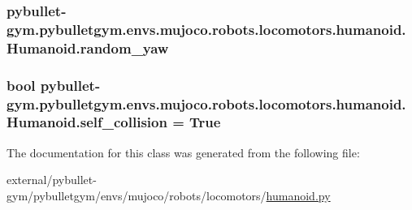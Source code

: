 \subsubsection[{\texorpdfstring{random\+\_\+yaw}{random_yaw}}]{\setlength{\rightskip}{0pt plus 5cm}pybullet-\/gym.\+pybulletgym.\+envs.\+mujoco.\+robots.\+locomotors.\+humanoid.\+Humanoid.\+random\+\_\+yaw}\hypertarget{classpybullet-gym_1_1pybulletgym_1_1envs_1_1mujoco_1_1robots_1_1locomotors_1_1humanoid_1_1_humanoid_a7bce1af1393e965d200d6770a3da069a}{}\label{classpybullet-gym_1_1pybulletgym_1_1envs_1_1mujoco_1_1robots_1_1locomotors_1_1humanoid_1_1_humanoid_a7bce1af1393e965d200d6770a3da069a}
\subsubsection[{\texorpdfstring{self\+\_\+collision}{self_collision}}]{\setlength{\rightskip}{0pt plus 5cm}bool pybullet-\/gym.\+pybulletgym.\+envs.\+mujoco.\+robots.\+locomotors.\+humanoid.\+Humanoid.\+self\+\_\+collision = True\hspace{0.3cm}{\ttfamily [static]}}\hypertarget{classpybullet-gym_1_1pybulletgym_1_1envs_1_1mujoco_1_1robots_1_1locomotors_1_1humanoid_1_1_humanoid_a788555aad5835f26da435d3cf99929ce}{}\label{classpybullet-gym_1_1pybulletgym_1_1envs_1_1mujoco_1_1robots_1_1locomotors_1_1humanoid_1_1_humanoid_a788555aad5835f26da435d3cf99929ce}


The documentation for this class was generated from the following file\+:\begin{DoxyCompactItemize}
\item 
external/pybullet-\/gym/pybulletgym/envs/mujoco/robots/locomotors/\hyperlink{mujoco_2robots_2locomotors_2humanoid_8py}{humanoid.\+py}\end{DoxyCompactItemize}
